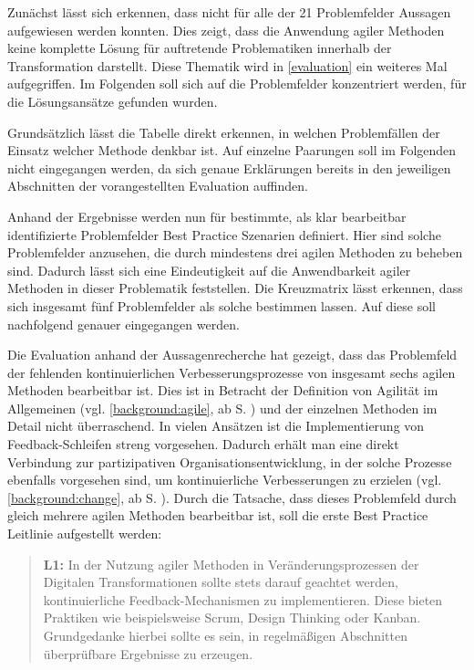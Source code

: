 Zunächst lässt sich erkennen, dass nicht für alle der 21 Problemfelder Aussagen aufgewiesen werden konnten. Dies zeigt, dass die Anwendung agiler Methoden keine komplette Lösung für auftretende Problematiken innerhalb der Transformation darstellt. Diese Thematik wird in \ref{evaluation} ein weiteres Mal aufgegriffen. Im Folgenden soll sich auf die Problemfelder konzentriert werden, für die Lösungsansätze gefunden wurden. 

Grundsätzlich lässt die Tabelle direkt erkennen, in welchen Problemfällen der Einsatz welcher Methode denkbar ist. Auf einzelne  Paarungen soll im Folgenden nicht eingegangen werden, da sich genaue Erklärungen bereits in den jeweiligen Abschnitten der vorangestellten Evaluation auffinden.

Anhand der Ergebnisse werden nun für bestimmte, als klar bearbeitbar identifizierte Problemfelder Best Practice Szenarien definiert. Hier sind solche Problemfelder anzusehen, die durch mindestens drei agilen Methoden zu beheben sind. Dadurch lässt sich eine Eindeutigkeit auf die Anwendbarkeit agiler Methoden in dieser Problematik feststellen. Die Kreuzmatrix lässt erkennen, dass sich insgesamt fünf Problemfelder als solche bestimmen lassen. Auf diese soll nachfolgend genauer eingegangen werden.

Die Evaluation anhand der Aussagenrecherche hat gezeigt, dass das Problemfeld der fehlenden kontinuierlichen Verbesserungsprozesse von insgesamt sechs agilen Methoden bearbeitbar ist. Dies ist in Betracht der Definition von Agilität im Allgemeinen (vgl. \ref{background:agile}, ab S. \pageref{background:agile}) und der einzelnen Methoden im Detail nicht überraschend. In vielen Ansätzen ist die Implementierung von Feedback-Schleifen streng vorgesehen. Dadurch erhält man eine direkt Verbindung zur partizipativen Organisationsentwicklung, in der solche Prozesse ebenfalls vorgesehen sind, um kontinuierliche Verbesserungen zu erzielen (vgl. \ref{background:change}, ab S. \pageref{background:change}). Durch die Tatsache, dass dieses Problemfeld durch gleich mehrere agilen Methoden bearbeitbar ist, soll die erste Best Practice Leitlinie aufgestellt werden:

\begin{quote}
	\textbf{L1:} In der Nutzung agiler Methoden in Veränderungsprozessen der Digitalen Transformationen sollte stets darauf geachtet werden, kontinuierliche Feedback-Mechanismen zu implementieren. Diese bieten Praktiken wie beispielsweise Scrum, Design Thinking oder Kanban. Grundgedanke hierbei sollte es sein, in regelmäßigen Abschnitten überprüfbare Ergebnisse zu erzeugen.
\end{quote}

